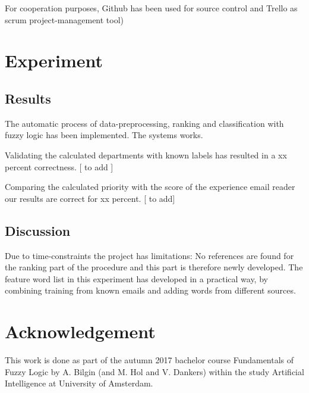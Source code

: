 \documentclass[journal]{IEEEtran}
\begin{document}
For cooperation purposes, Github has been used for source control and Trello as scrum project-management tool)

\section{Experiment}

\subsection{Results}

The automatic process of data-preprocessing, ranking and classification with fuzzy logic has been implemented. The systems works. 

Validating the calculated departments with known labels has resulted in a xx percent correctness. [ to add ]

Comparing the calculated priority with the score of the experience email reader our results are correct for xx percent. [ to add]

\subsection{Discussion}

Due to time-constraints the project has limitations: No references are found for the ranking part of the procedure and this part is therefore newly developed. The feature word list in this experiment has developed in a practical way, by combining training from known emails and adding words from different sources.

\section{Acknowledgement}

This work is done as part of the autumn 2017 bachelor course Fundamentals of Fuzzy Logic by A. Bilgin (and  M. Hol and V. Dankers) within the study Artificial Intelligence at University of Amsterdam.

\end{document}
